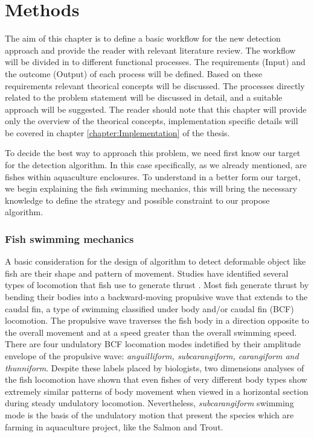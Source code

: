 \chapter{Methods}
\label{chapter:Methods}

The aim of this chapter is to define a basic workflow for the new detection approach
and provide the reader with relevant literature review. The workflow will be divided
in to different functional processes. The requirements (Input) and the outcome (Output)
of each process will be defined. Based on these requirements relevant theorical concepts
will be discussed. The processes directly related to the problem statement will be 
discussed in detail, and a suitable approach will be suggested. The reader should
note that this chapter will provide only the overview of the theorical concepts, 
implementation specific details will be covered in chapter \ref{chapter:Implementation} of the thesis.

To decide the best way to approach this problem, we need first know our target for
the detection algorithm. In this case specifically, as we already mentioned, are fishes
within aquaculture enclosures. To understand in a better form our target, we begin
explaining the fish swimming mechanics, this will bring the necessary knowledge to define 
the strategy and possible constraint to our propose algorithm.

\subsection{Fish swimming mechanics}
\label{sec:fishswimming}
A basic consideration for the design of algorithm to detect deformable object like fish are
their shape and pattern of movement. Studies have identified several types of locomotion that
fish use to generate thrust \citet{Hawkes2008,Colgate2004}. Most fish generate thrust by bending their
bodies into a backward-moving propulsive wave that extends to the caudal fin, a type of
swimming classified under body and/or caudal fin (BCF) locomotion. The propulsive wave traverses
the fish body in a direction opposite to the overall movement and at a speed greater than 
the overall swimming speed. There are four undulatory BCF locomation modes indetified by their
amplitude envelope of the propulsive wave: \textit{anguilliform, subcarangiform, 
carangiform and thunniform}. Despite these labels placed by biologists, two dimensions analyses
of the fish locomotion have shown that even fishes of very different body types show extremely similar 
patterns of body movement when viewed in a horizontal section during steady undulatory locomotion. 
Nevertheless, \textit{subcarangiform} swimming mode is the basis of the undulatory motion that present
the species which are farming in aquaculture project, like the Salmon and Trout.


